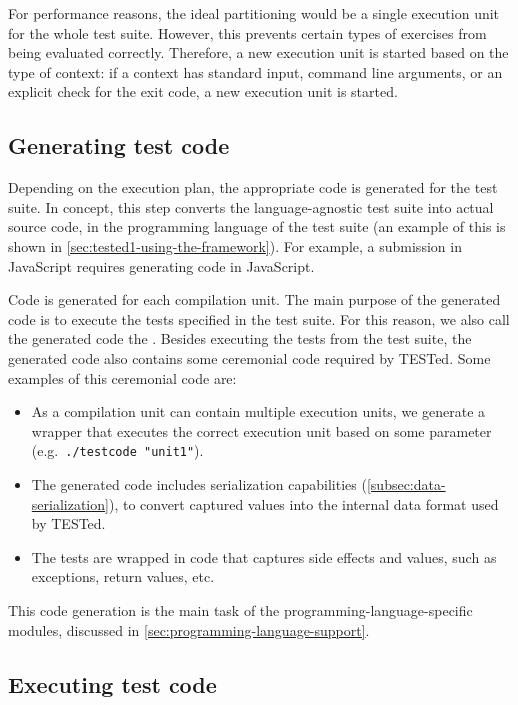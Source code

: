 \documentclass[../main]{subfiles}
\begin{document}
For performance reasons, the ideal partitioning would be a single execution unit for the whole test suite.
However, this prevents certain types of exercises from being evaluated correctly.
Therefore, a new execution unit is started based on the type of context: if a context has standard input, command line arguments, or an explicit check for the exit code, a new execution unit is started.

\subsection{Generating test code}\label{subsec:code-generation}

Depending on the execution plan, the appropriate code is generated for the test suite.
In concept, this step converts the language-agnostic test suite into actual source code, in the programming language of the test suite (an example of this is shown in \cref{sec:tested1-using-the-framework}).
For example, a submission in JavaScript requires generating code in JavaScript.

Code is generated for each compilation unit.
The main purpose of the generated code is to execute the tests specified in the test suite.
For this reason, we also call the generated code the .
Besides executing the tests from the test suite, the generated code also contains some ceremonial code required by TESTed.
Some examples of this ceremonial code are:

\begin{itemize}
    \item As a compilation unit can contain multiple execution units, we generate a wrapper that executes the correct execution unit based on some parameter (e.g.\ \texttt{./testcode "unit1"}).
    \item The generated code includes serialization capabilities (\cref{subsec:data-serialization}), to convert captured values into the internal data format used by TESTed.
    \item The tests are wrapped in code that captures side effects and values, such as exceptions, return values, etc.
\end{itemize}

This code generation is the main task of the programming-language-specific modules, discussed in \cref{sec:programming-language-support}.

\subsection{Executing test code}\label{subsec:executing-test-code}
\end{document}
